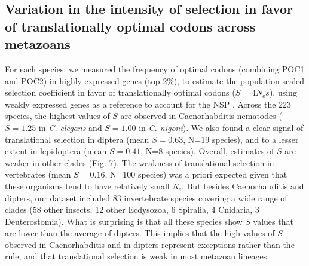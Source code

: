 \subsection{Variation in the intensity of selection in favor of translationally optimal codons across metazoans}

For each species, we measured the frequency of optimal codons (combining POC1 and POC2) in highly expressed genes (top 2\%), to estimate the population-scaled selection coefficient in favor of translationally optimal codons ($S=4\textit{N}_{\text{e}}s$), using weakly expressed genes as a reference to account for the NSP \citep{sharp_variation_2005}. Across the 223 species, the highest values of $S$ are observed in Caenorhabditis nematodes ($S=1.25$ in \textit{C. elegans} and $S=1.00$ in \textit{C. nigoni}). We also found a clear signal of translational selection in diptera (mean $S=0.63$, N=19 species), and to a lesser extent in lepidoptera (mean $S=0.41$, N=8 species). Overall, estimates of $S$ are weaker in other clades (\hyperref[fig:CU7]{Fig. 7}). The weakness of translational selection in vertebrates (mean $S=0.16$, N=100 species) was a priori expected given that these organisms tend to have relatively small \textit{N}$_{\text{e}}$. But besides Caenorhabditis and dipters, our dataset included 83 invertebrate species covering a wide range of clades (58 other insects, 12 other Ecdysozoa, 6 Spiralia, 4 Cnidaria, 3 Deuterostomia). What is surprising is that all these species show $S$ values that are lower than the average of dipters. This implies that the high values of $S$ observed in Caenorhabditis and in dipters represent exceptions rather than the rule, and that translational selection is weak in most metazoan lineages.


